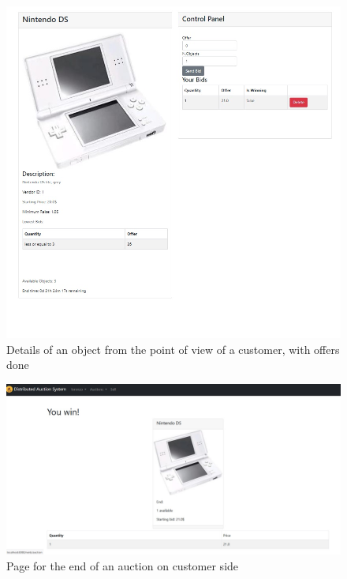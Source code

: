 \begin{figure}[htb]
	\centering
	\includegraphics[width=\textwidth]{img/bid.jpg}
	\caption{Details of an object from the point of view of a customer, with
	offers done}\label{fig:bid}
\end{figure}


\begin{figure}[htb]
	\centering
	\includegraphics[width=\textwidth]{img/win.jpg}
	\caption{Page for the end of an auction on customer side}\label{fig:win}
\end{figure}
